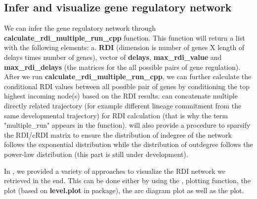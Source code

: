 \documentclass[10pt,oneside]{article}\usepackage[]{graphicx}\usepackage[]{color}
\begin{document}
\subsection{Infer and visualize gene regulatory network}

We can infer the gene regulatory network through \textbf{calculate\_rdi\_multiple\_run\_cpp} function. This function will return a list with the following elements:
a. \textbf{RDI} (dimension is number of genes X length of delays times number of genes), vector of \textbf{delays}, \textbf{max\_rdi\_value} and \textbf{max\_rdi\_delays} (the matrices for the all possible pairs of gene regulation). After we run \textbf{calculate\_rdi\_multiple\_run\_cpp}, we can further calculate the conditional RDI values between all possible pair of genes by conditioning the top highest incoming node(s) based on the RDI results.  can concatenate multiple directly related trajectory (for example different lineage commitment from the same developmental trajectory) for RDI calculation (that is why the term "multiple\_run" appears in the function).  will also provide a procedure to sparsify the RDI/cRDI matrix to ensure  the distribution of indegree of the network follows the exponential distribution while the distribution of outdegree follows the power-law distribution (this part is still under development).

In , we provided a variety of approaches to visualize the RDI network we retrieved in the end. This can be done either by using the ,  plotting function, the  plot (based on \textbf{level.plot} in  package), the arc diagram plot as well as the  plot.
\end{document}
